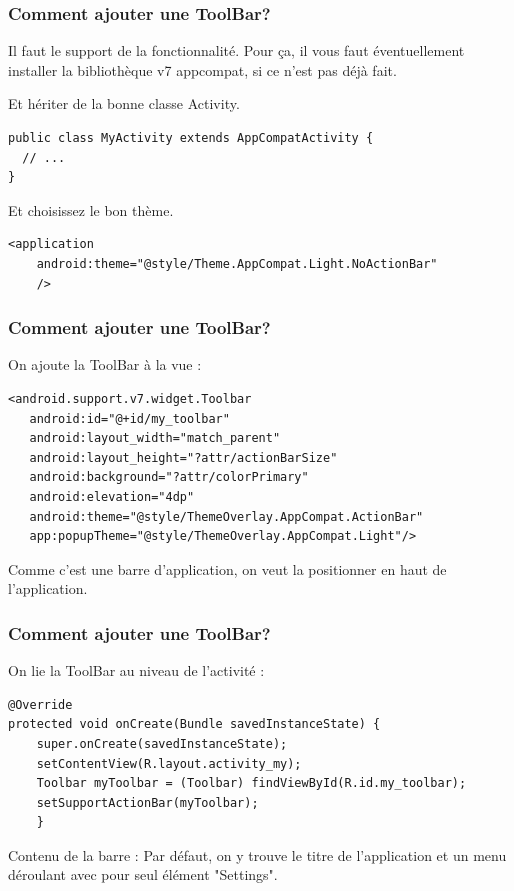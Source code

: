 \documentclass{beamer}
\begin{document}
\begin{frame}[fragile]
\frametitle{Comment ajouter une ToolBar?}

\begin{block}{Il faut le support de la fonctionnalité.}
Pour ça, il vous faut éventuellement installer la bibliothèque v7 appcompat, si ce n'est pas déjà fait.
\end{block}

\begin{block}{Et hériter de la bonne classe Activity.}
\begin{lstlisting}
public class MyActivity extends AppCompatActivity {
  // ...
}
\end{lstlisting}
\pause
\begin{block}{Et choisissez le bon thème.}
\lstset{language=xml}
\begin{lstlisting}
<application
    android:theme="@style/Theme.AppCompat.Light.NoActionBar"
    />
\end{lstlisting}
\lstset{language=java}
\end{block}
\end{block}
\end{frame}


\begin{frame}[fragile]
\frametitle{Comment ajouter une ToolBar?}

\begin{block}{On ajoute la ToolBar à la vue :}
\lstset{language=xml}
\begin{lstlisting}
<android.support.v7.widget.Toolbar
   android:id="@+id/my_toolbar"
   android:layout_width="match_parent"
   android:layout_height="?attr/actionBarSize"
   android:background="?attr/colorPrimary"
   android:elevation="4dp"
   android:theme="@style/ThemeOverlay.AppCompat.ActionBar"
   app:popupTheme="@style/ThemeOverlay.AppCompat.Light"/>
\end{lstlisting}
\lstset{language=java}
\end{block}
\begin{block}{}
Comme c'est une barre d'application, on veut la positionner en haut de l'application.
\end{block}
\end{frame}

\begin{frame}[fragile]
\frametitle{Comment ajouter une ToolBar?}

\begin{block}{On lie la ToolBar au niveau de l'activité :}
\lstset{language=java}
\begin{lstlisting}
@Override
protected void onCreate(Bundle savedInstanceState) {
    super.onCreate(savedInstanceState);
    setContentView(R.layout.activity_my);
    Toolbar myToolbar = (Toolbar) findViewById(R.id.my_toolbar);
    setSupportActionBar(myToolbar);
    }
\end{lstlisting}
\lstset{language=java}
\end{block}
\begin{exampleblock}{Contenu de la barre :}
Par défaut, on y trouve le titre de l'application et un menu déroulant avec pour seul élément "Settings".
\end{exampleblock}
\end{frame}
\end{document}
